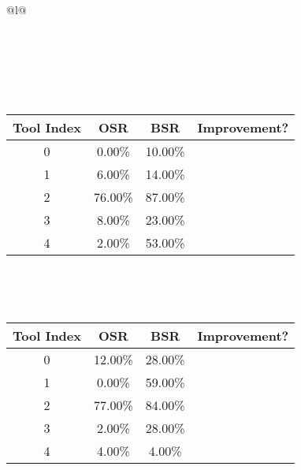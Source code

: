 \begin{longtable}{@{}l@{}}
\caption{Tool selection results for llama3.2:3b on ollama with attacker llama3.2:3b and defense objective. \\ \textbf{Overall Improvement: 84.00\%}} \\
\toprule
{} \\
\midrule
\endfirsthead
\toprule
{} \\
\midrule
\endhead
\bottomrule
\endfoot
\begin{minipage}{\textwidth}
\centering{}\\[0.8ex]
\begin{tabular}{|c|c|c|c|} \hline
\textbf{Tool Index} & \textbf{OSR} & \textbf{ BSR} & \textbf{Improvement?} \\ \hline
0 & 0.00\% & 10.00\% & \textcolor{green}{\ding{51}} \\ \hline
1 & 6.00\% & 14.00\% & \textcolor{green}{\ding{51}} \\ \hline
2 & 76.00\% & 87.00\% & \textcolor{green}{\ding{51}} \\ \hline
3 & 8.00\% & 23.00\% & \textcolor{green}{\ding{51}} \\ \hline
4 & 2.00\% & 53.00\% & \textcolor{green}{\ding{51}} \\ \hline
\end{tabular}
\end{minipage}\\[2ex]
\begin{minipage}{\textwidth}
\centering\vspace{2ex}
\\[0.8ex]
\begin{tabular}{|c|c|c|c|} \hline
\textbf{Tool Index} & \textbf{OSR} & \textbf{ BSR} & \textbf{Improvement?} \\ \hline
0 & 12.00\% & 28.00\% & \textcolor{green}{\ding{51}} \\ \hline
1 & 0.00\% & 59.00\% & \textcolor{green}{\ding{51}} \\ \hline
2 & 77.00\% & 84.00\% & \textcolor{green}{\ding{51}} \\ \hline
3 & 2.00\% & 28.00\% & \textcolor{green}{\ding{51}} \\ \hline
4 & 4.00\% & 4.00\% & \textcolor{red}{\ding{55}} \\ \hline

\end{tabular}
\end{minipage}
\end{longtable}
